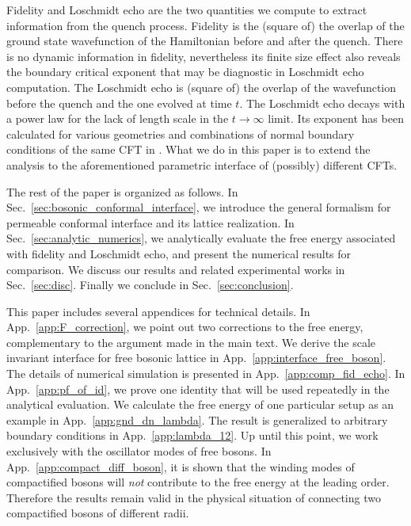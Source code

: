 Fidelity and Loschmidt echo are the two quantities we compute to extract information from the quench process. Fidelity is the (square of) the overlap of the ground state wavefunction of the Hamiltonian before and after the quench. There is no dynamic information in fidelity, nevertheless its finite size effect also reveals the boundary critical exponent that may be diagnostic in Loschmidt echo computation. The Loschmidt echo is (square of) the overlap of the wavefunction before the quench and the one evolved at time $t$. The Loschmidt echo decays with a power law for the lack of length scale in the $t \rightarrow \infty$ limit. Its exponent has been calculated for various geometries and combinations of normal boundary conditions of the same CFT in . What we do in this paper is to extend the analysis to the aforementioned parametric interface of (possibly) different CFTs. 

The rest of the paper is organized as follows. In Sec.~\ref{sec:bosonic_conformal_interface}, we introduce the general formalism for permeable conformal interface and its lattice realization. In Sec.~\ref{sec:analytic_numerics}, we analytically evaluate the free energy associated with fidelity and Loschmidt echo, and present the numerical results for comparison. We discuss our results and related experimental works in Sec.~\ref{sec:disc}. Finally we conclude in Sec.~\ref{sec:conclusion}. 

This paper includes several appendices for technical details. In App.~\ref{app:F_correction}, we point out two corrections to the free energy, complementary to the argument made in the main text. We derive the scale invariant interface for free bosonic lattice in App.~\ref{app:interface_free_boson}. The details of numerical simulation is presented in App.~\ref{app:comp_fid_echo}. In App.~\ref{app:pf_of_id}, we prove one identity that will be used repeatedly in the analytical evaluation. We calculate the free energy of one particular setup as an example in App.~\ref{app:gnd_dn_lambda}. The result is generalized to arbitrary boundary conditions in App.~\ref{app:lambda_12}. Up until this point, we work exclusively with the oscillator modes of free bosons. In App.~\ref{app:compact_diff_boson}, it is shown that the winding modes of compactified bosons will \emph{not} contribute to the free energy at the leading order. Therefore the results remain valid in the physical situation of connecting two compactified bosons of different radii.


